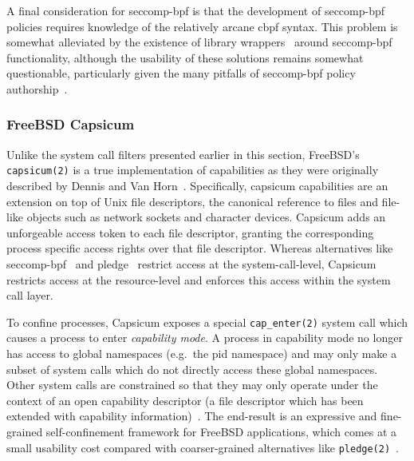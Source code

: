 A final consideration for seccomp-bpf is that the development of seccomp-bpf policies
requires knowledge of the relatively arcane \gls{cbpf} syntax. This problem is somewhat
alleviated by the existence of library wrappers~\cite{libseccomp} around seccomp-bpf
functionality, although the usability of these solutions remains somewhat questionable,
particularly given the many pitfalls of seccomp-bpf policy
authorship~\cite{anderson2017_comparison}.

\subsubsection*{FreeBSD Capsicum}
\label{sss:capsicum}

Unlike the system call filters presented earlier in this section, FreeBSD's
\texttt{capsicum(2)} \cite{watson2010_capsicum, anderson2017_comparison} is a true
implementation of capabilities as they were originally described by Dennis and Van
Horn~\cite{dennis1966_semantics}. Specifically, capsicum capabilities are an extension on
top of Unix file descriptors, the canonical reference to files and file-like objects such
as network sockets and character devices. Capsicum adds an unforgeable access token to
each file descriptor, granting the corresponding process specific access rights over that
file descriptor. Whereas alternatives like seccomp-bpf~\cite{seccomp} and
pledge~\cite{pledge} restrict access at the system-call-level, Capsicum restricts access
at the resource-level and enforces this access within the system call layer.

To confine processes, Capsicum exposes a special \texttt{cap\_enter(2)} system call which
causes a process to enter \textit{capability mode}. A process in capability mode no longer
has access to global namespaces (e.g.\ the \gls{pid} namespace) and may only make a subset of
system calls which do not directly access these global namespaces. Other system calls are
constrained so that they may only operate under the context of an open capability
descriptor (a file descriptor which has been extended with capability
information)~\cite{watson2010_capsicum}. The end-result is an expressive and fine-grained
self-confinement framework for FreeBSD applications, which comes at a small usability cost
compared with coarser-grained alternatives like \texttt{pledge(2)}~\cite{pledge}.





